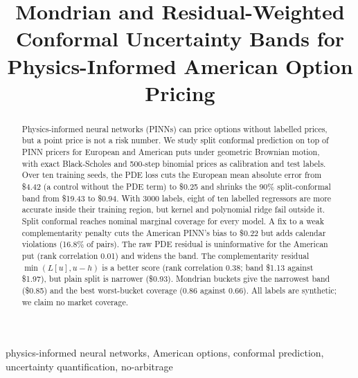 \documentclass[conference]{IEEEtran}
\newcommand{\usd}{\$}
\begin{document}
\title{Mondrian and Residual-Weighted Conformal Uncertainty Bands for Physics-Informed American Option Pricing}

\author{
\and
{}
\and
{}
}

\maketitle

\begin{abstract}
Physics-informed neural networks (PINNs) can price options without labelled prices, but a point price is not a risk number. We study split conformal prediction on top of PINN pricers for European and American puts under geometric Brownian motion, with exact Black-Scholes and 500-step binomial prices as calibration and test labels. Over ten training seeds, the PDE loss cuts the European mean absolute error from \usd 4.42 (a control without the PDE term) to \usd 0.25 and shrinks the 90\% split-conformal band from \usd 19.43 to \usd 0.94. With 3000 labels, eight of ten labelled regressors are more accurate inside their training region, but kernel and polynomial ridge fail outside it. Split conformal reaches nominal marginal coverage for every model. A fix to a weak complementarity penalty cuts the American PINN's bias to \usd 0.22 but adds calendar violations (16.8\% of pairs). The raw PDE residual is uninformative for the American put (rank correlation 0.01) and widens the band. The complementarity residual $\min(L[u],u-h)$ is a better score (rank correlation 0.38; band \usd 1.13 against \usd 1.97), but plain split is narrower (\usd 0.93). Mondrian buckets give the narrowest band (\usd 0.85) and the best worst-bucket coverage (0.86 against 0.66). All labels are synthetic; we claim no market coverage.
\end{abstract}

\begin{IEEEkeywords}
physics-informed neural networks, American options, conformal prediction, uncertainty quantification, no-arbitrage
\end{IEEEkeywords}
\end{document}
